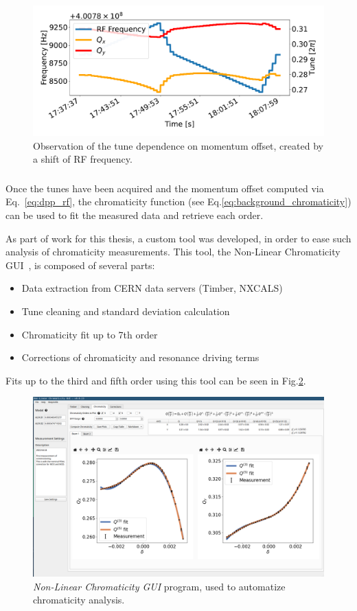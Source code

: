 \begin{figure}[H]
    \centering
    \includegraphics[width=1\textwidth]{images/rf_scan.pdf}
    \caption{Observation of the tune dependence on momentum offset, created by a shift of RF
             frequency.}
    \label{fig:measurements:rf_scan}
\end{figure}




\subsubsection{}

Once the tunes have been acquired and the momentum offset computed via Eq.~\eqref{eq:dpp_rf}, the
chromaticity function (see Eq.\eqref{eq:background_chromaticity}) can be used to fit the
measured data and retrieve each order.

As part of work for this thesis, a custom tool was developed, in order to ease such analysis of
chromaticity measurements. This tool, the Non-Linear Chromaticity
GUI~\cite{m_le_garrec_non-linear_2022}, is composed of several parts:

\begin{itemize}
    \tightlist
    \item Data extraction from CERN data servers (Timber, NXCALS)
    \item Tune cleaning and standard deviation calculation
    \item Chromaticity fit up to 7th order
    \item Corrections of chromaticity and resonance driving terms
\end{itemize}

Fits up to the third and fifth order using this tool can be seen in Fig.\ref{fig:chroma_gui}.

\begin{figure}[H]
    \includegraphics[width=\textwidth]{./images/chroma_gui.png}
    \caption{\textit{Non-Linear Chromaticity GUI} program, used to automatize chromaticity 
             analysis.}
    \label{fig:chroma_gui}
\end{figure}